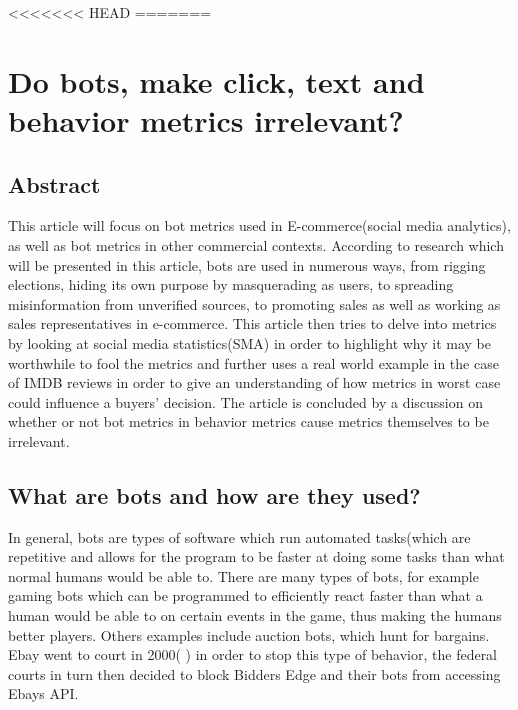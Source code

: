 <<<<<<< HEAD
=======
\chapter[Bot Metrics]{Do bots,  make click, text and behavior metrics irrelevant?}
\section{Abstract}
This article will focus on bot metrics used in E-commerce(social media analytics), as well as bot metrics in other commercial contexts. According to research which will be presented in this article, bots are used in numerous ways, from rigging elections, hiding its own purpose by masquerading as users, to spreading misinformation from unverified sources, to promoting sales as well as working as sales representatives in e-commerce. This article then tries to delve into metrics by looking at social media statistics(SMA) in order to highlight why it may be worthwhile to fool the metrics and further uses a real world example in the case of IMDB reviews in order to give an understanding of how metrics in worst case could influence a buyers' decision. The article is concluded by a discussion on whether or not bot metrics in behavior metrics cause metrics themselves to be irrelevant. 

\section{What are bots and how are they used?}\label{intro:howwhenwhy}
In general, bots are types of software which run automated tasks(which are repetitive and allows for the program to be faster at doing some tasks than what normal humans would be able to. There are many types of bots, for example gaming bots which can be programmed to efficiently react faster than what a human would be able to on certain events in the game, thus making the humans better players. Others examples include auction bots, which hunt for bargains. Ebay went to court in 2000( \cite{Computerworld:Ebay}) in order to stop this type of behavior, the federal courts in turn then decided to block Bidders Edge and their bots from accessing Ebays API.
\\


